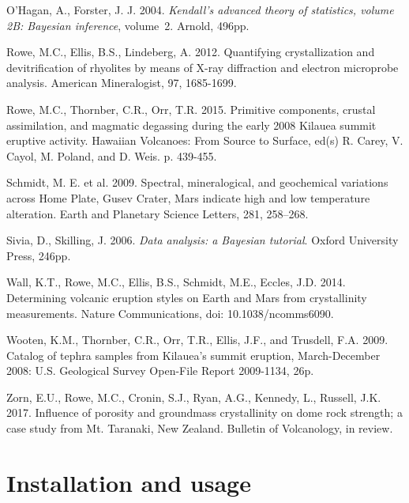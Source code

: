 \documentclass[preprint, a4paper]{elsarticle}
\begin{document}
\begin{thebibliography}{99}
O'Hagan, A., Forster, J. J. 2004.
\newblock \emph{Kendall's advanced theory of statistics, volume 2B: Bayesian
  inference}, volume~2.
\newblock Arnold, 496pp.

Rowe, M.C., Ellis, B.S., Lindeberg, A. 2012. Quantifying crystallization and devitrification of rhyolites by means of X-ray diffraction and electron microprobe analysis. American Mineralogist, 97, 1685-1699.


Rowe, M.C., Thornber, C.R., Orr, T.R. 2015. Primitive components, crustal assimilation, and magmatic degassing during the early 2008 Kilauea summit eruptive activity. Hawaiian Volcanoes: From Source to Surface, ed(s) R. Carey, V. Cayol, M. Poland, and D. Weis. p. 439-455.

Schmidt, M. E. et al. 2009. Spectral, mineralogical, and geochemical variations across Home Plate, Gusev Crater, Mars indicate high and low temperature alteration. Earth and Planetary Science Letters, 281, 258–268.

Sivia, D., Skilling, J. 2006.
\newblock \emph{Data analysis: a Bayesian tutorial}.
\newblock Oxford University Press, 246pp.

Wall, K.T., Rowe, M.C., Ellis, B.S., Schmidt, M.E., Eccles, J.D. 2014. Determining volcanic eruption styles on Earth and Mars from crystallinity measurements. Nature Communications, doi: 10.1038/ncomms6090.

Wooten, K.M., Thornber, C.R., Orr, T.R., Ellis, J.F., and Trusdell, F.A. 2009. Catalog of tephra samples from Kilauea's summit eruption, March-December 2008: U.S. Geological Survey Open-File Report 2009-1134, 26p.

Zorn, E.U., Rowe, M.C., Cronin, S.J., Ryan, A.G., Kennedy, L., Russell, J.K. 2017. Influence of porosity and groundmass crystallinity on dome rock strength; a case study from Mt. Taranaki, New Zealand. Bulletin of Volcanology, in review.


\end{thebibliography}

\appendix
\section{Installation and usage}\label{sec:program}
\end{document}
